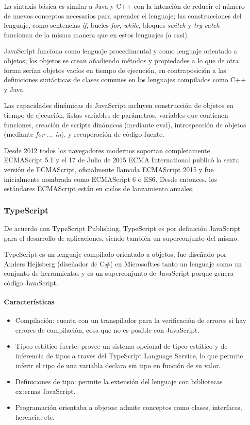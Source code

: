 La sintaxis básica es similar a Java y C++ con la intención de reducir el número de nuevos conceptos necesarios para aprender el lenguaje; las construcciones del lenguaje, como sentencias \textit{if}, bucles \textit{for}, \textit{while}, bloques \textit{switch} y \textit{try catch} funcionan de la misma manera que en estos lenguajes (o casi).


JavaScript funciona como lenguaje procedimental y como lenguaje orientado a objetos; los objetos se crean añadiendo métodos y propiedades a lo que de otra forma serían objetos vacíos en tiempo de ejecución, en contraposición a las definiciones sintácticas de clases comunes en los lenguajes compilados como C++ y Java.


Las capacidades dinámicas de JavaScript incluyen construcción de objetos en tiempo de ejecución, listas variables de parámetros, variables que contienen funciones, creación de scripts dinámicos (mediante eval), introspección de objetos (mediante \textit{for ... in}), y recuperación de código fuente.


Desde 2012 todos los navegadores modernos soportan completamente ECMAScript 5.1 y el 17 de Julio de 2015 ECMA International publicó la sexta versión de ECMAScript, oficialmente llamada ECMAScript 2015 y fue inicialmente nombrada como ECMAScript 6 o ES6. Desde entonces, los estándares ECMAScript están en ciclos de lanzamiento anuales.


\subsubsection*{TypeScript}
De acuerdo con TypeScript Publishing\cite{typescript_publishing_typescript_2019}, TypeScript es por definición JavaScript para el desarrollo de aplicaciones, siendo también un superconjunto del mismo.


TypeScript es un lenguaje compilado orientado a objetos, fue diseñado por Anders Hejlsberg (diseñador de C\#) en Microsoft;es tanto un lenguaje como un conjunto de herramientas y es un superconjunto de JavaScript porque genera código JavaScript.


\paragraph*{Características}
\begin{itemize}
    \item Compilación: cuenta con un transpilador para la verificación de errores si hay errores de compilación, cosa que no es posible con JavaScript.
    \item Tipeo estático fuerte: provee un sistema opcional de tipeo estático y de inferencia de tipos a traves del TypeScript Language Service, lo que permite inferir el tipo de una variabla declara sin tipo en función de su valor.
    \item Definiciones de tipo: permite la extensión del lenguaje con bibliotecas externas JavaScript.
    \item Programación orientaba a objetos: admite conceptos como clases, interfaces, herencia, etc.
\end{itemize}



